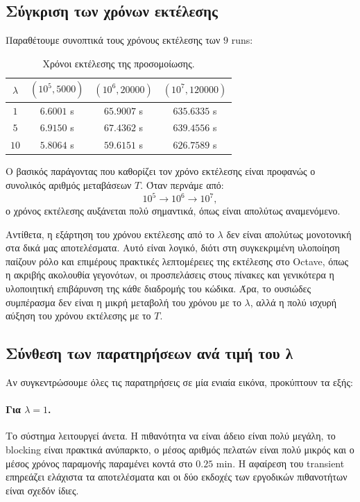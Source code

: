 \documentclass{article}
\begin{document}
\subsection{Σύγκριση των χρόνων εκτέλεσης}

Παραθέτουμε συνοπτικά τους χρόνους εκτέλεσης των $9$ runs:

\begin{table}[h!]
\centering
\caption{Χρόνοι εκτέλεσης της προσομοίωσης.}
\begin{tabular}{|c|c|c|c|}
\hline
$\lambda$ & $(10^5,5000)$ & $(10^6,20000)$ & $(10^7,120000)$ \\ \hline
$1$  & $6.6001$ s  & $65.9007$ s & $635.6335$ s \\ \hline
$5$  & $6.9150$ s  & $67.4362$ s & $639.4556$ s \\ \hline
$10$ & $5.8064$ s  & $59.6151$ s & $626.7589$ s \\ \hline
\end{tabular}
\end{table}

Ο βασικός παράγοντας που καθορίζει τον χρόνο εκτέλεσης είναι προφανώς ο συνολικός αριθμός μεταβάσεων $T$. Όταν περνάμε από:
\[
10^5 \to 10^6 \to 10^7,
\]
ο χρόνος εκτέλεσης αυξάνεται πολύ σημαντικά, όπως είναι απολύτως αναμενόμενο.

Αντίθετα, η εξάρτηση του χρόνου εκτέλεσης από το $\lambda$ δεν είναι απολύτως μονοτονική στα δικά μας αποτελέσματα. Αυτό είναι λογικό, διότι στη συγκεκριμένη υλοποίηση παίζουν ρόλο και επιμέρους πρακτικές λεπτομέρειες της εκτέλεσης στο Octave, όπως η ακριβής ακολουθία γεγονότων, οι προσπελάσεις στους πίνακες και γενικότερα η υλοποιητική επιβάρυνση της κάθε διαδρομής του κώδικα. Άρα, το ουσιώδες συμπέρασμα δεν είναι η μικρή μεταβολή του χρόνου με το $\lambda$, αλλά η πολύ ισχυρή αύξηση του χρόνου εκτέλεσης με το $T$.

\subsection{Σύνθεση των παρατηρήσεων ανά τιμή του λ}

Αν συγκεντρώσουμε όλες τις παρατηρήσεις σε μία ενιαία εικόνα, προκύπτουν τα εξής:

\paragraph{Για $\lambda=1$.}
Το σύστημα λειτουργεί άνετα. Η πιθανότητα να είναι άδειο είναι πολύ μεγάλη, το blocking είναι πρακτικά ανύπαρκτο, ο μέσος αριθμός πελατών είναι πολύ μικρός και ο μέσος χρόνος παραμονής παραμένει κοντά στο $0.25$ min. Η αφαίρεση του transient επηρεάζει ελάχιστα τα αποτελέσματα και οι δύο εκδοχές των εργοδικών πιθανοτήτων είναι σχεδόν ίδιες.
\end{document}
